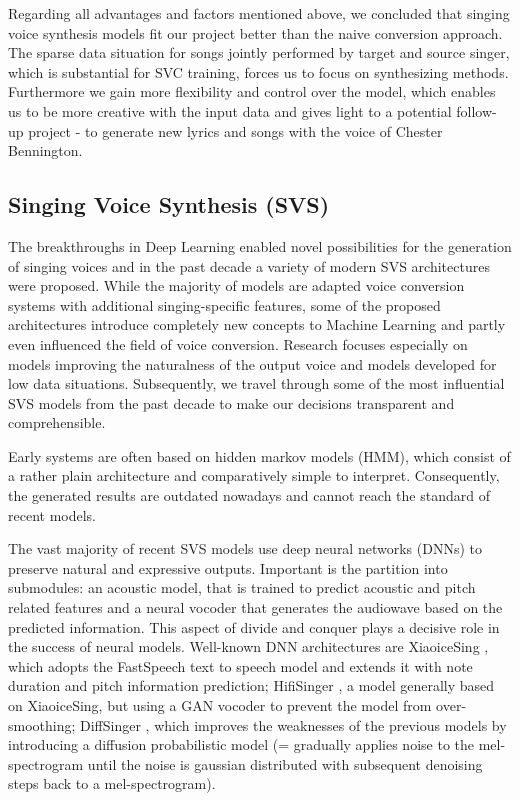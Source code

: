 \documentclass[a4paper]{article}
\begin{document}
	Regarding all advantages and factors mentioned above, we concluded that singing voice synthesis models fit our project better than the naive conversion approach. The sparse data situation for songs jointly performed by target and source singer, which is substantial for SVC training, forces us to focus on synthesizing methods. Furthermore we gain more flexibility and control over the model, which enables us to be more creative with the input data and gives light to a potential follow-up project - to generate new lyrics and songs with the voice of Chester Bennington.
	
	\subsection{Singing Voice Synthesis (SVS)}
	
	The breakthroughs in Deep Learning enabled novel possibilities for the generation of singing voices and in the past decade a variety of modern SVS architectures were proposed. While the majority of models are adapted voice conversion systems with additional singing-specific features, some of the proposed architectures introduce completely new concepts to Machine Learning and partly even influenced the field of voice conversion. Research focuses especially on models improving the naturalness of the output voice and models developed for low data situations. Subsequently, we travel through some of the most influential SVS models from the past decade to make our decisions transparent and comprehensible. \cite{Cho2021}
	
	Early systems are often based on hidden markov models (HMM), which consist of a rather plain architecture and comparatively simple to interpret. Consequently, the generated results are outdated nowadays and cannot reach the standard of recent models. \cite{Cho2021}
	
	The vast majority of recent SVS models use deep neural networks (DNNs) to preserve natural and expressive outputs. Important is the partition into submodules: an acoustic model, that is trained to predict acoustic and pitch related features and a neural vocoder that generates the audiowave based on the predicted information. This aspect of divide and conquer plays a decisive role in the success of neural models. Well-known DNN architectures are XiaoiceSing \cite{Cho2021}, which adopts the FastSpeech text to speech model and extends it with note duration and pitch information prediction; HifiSinger \cite{Cho2021}, a model generally based on XiaoiceSing, but using a GAN vocoder to prevent the model from over-smoothing; DiffSinger \cite{DiffSinger2021}, which improves the weaknesses of the previous models by introducing a diffusion probabilistic model (= gradually applies noise to the mel-spectrogram until the noise is gaussian distributed with subsequent denoising steps back to a mel-spectrogram).
	
\end{document}
